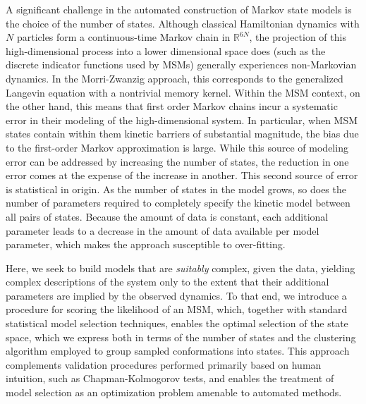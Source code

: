 \documentclass[journal=jpcbfk, layout=traditional, manuscript=article]{achemso}
\begin{document}
A significant challenge in the automated construction of Markov state models is the choice of the number of states\cite{McGibbon2013Learning}. Although classical Hamiltonian dynamics with $N$ particles form a continuous-time Markov chain in $\mathbb{R}^{6N}$\cite{vanKampen}, the projection of this high-dimensional process into a lower dimensional space does (such as the discrete indicator functions used by MSMs) generally experiences non-Markovian dynamics. In the Morri-Zwanzig approach, this corresponds to the generalized Langevin equation with a nontrivial memory kernel\cite{ZM}. Within the MSM context, on the other hand, this means that first order Markov chains incur a systematic error in their modeling of the high-dimensional system. In particular, when MSM states contain within them kinetic barriers of substantial magnitude, the bias due to the first-order Markov approximation is large. While this source of modeling error can be addressed by increasing the number of states, the reduction in one error comes at the expense of the increase in another. This second source of error is statistical in origin. As the number of states in the model grows, so does the number of parameters required to completely specify the kinetic model between all pairs of states. Because the amount of data is constant, each additional parameter leads to a decrease in the amount of data available per model parameter, which makes the approach susceptible to over-fitting.

Here, we seek to build models that are \emph{suitably} complex, given the data, yielding complex descriptions of the system only to the extent that their additional parameters are implied by the observed dynamics. To that end, we introduce a procedure for scoring the likelihood of an MSM, which, together with standard statistical model selection techniques, enables the optimal selection of the state space, which we express both in terms of the number of states and the clustering algorithm employed to group sampled conformations into states. This approach complements validation procedures performed primarily based on human intuition, such as Chapman-Kolmogorov tests, and enables the treatment of model selection as an optimization problem amenable to automated methods.
\end{document}
